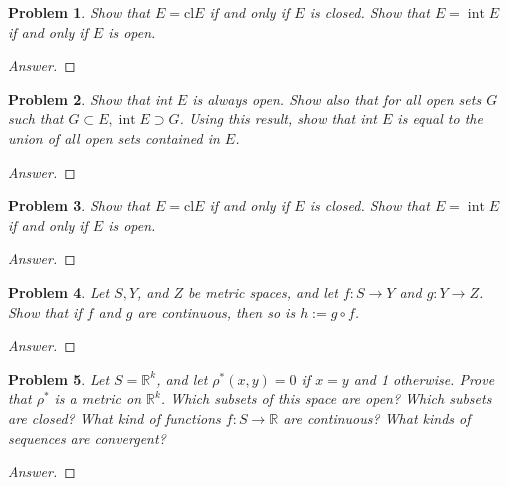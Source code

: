 \documentclass{article}
\newtheorem{problem}{Problem}[section]
\begin{document}
\begin{problem}
Show that $E=\mathrm{cl} E$ if and only if $E$ is closed. Show that $E=\operatorname{int} E$ if and only if $E$ is open.
\end{problem}

\begin{proof}[Answer]
    
\end{proof}

\begin{problem}
Show that int $E$ is always open. Show also that for all open sets $G$ such that $G \subset E, \operatorname{int} E \supset G$. Using this result, show that int $E$ is equal to the union of all open sets contained in $E$.
\end{problem}

\begin{proof}[Answer]
    
\end{proof}

\begin{problem}
Show that $E=\mathrm{cl} E$ if and only if $E$ is closed. Show that $E=\operatorname{int} E$ if and only if $E$ is open.
\end{problem}

\begin{proof}[Answer]
    
\end{proof}

\begin{problem}
Let $S, Y$, and $Z$ be metric spaces, and let $f: S \rightarrow Y$ and $g: Y \rightarrow Z$. Show that if $f$ and $g$ are continuous, then so is $h:=g \circ f$.
\end{problem}

\begin{proof}[Answer]
    
\end{proof}

\begin{problem}
Let $S=\mathbb{R}^{k}$, and let $\rho^{*}(x, y)=0$ if $x=y$ and 1 otherwise. Prove that $\rho^{*}$ is a metric on $\mathbb{R}^{k}$. Which subsets of this space are open? Which subsets are closed? What kind of functions $f: S \rightarrow \mathbb{R}$ are continuous? What kinds of sequences are convergent?
\end{problem}

\begin{proof}[Answer]
    
\end{proof}
\end{document}

